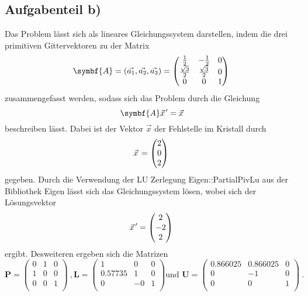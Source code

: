 \subsection*{Aufgabenteil b)}
Das Problem lässt sich als lineares Gleichungssystem darstellen, indem die drei primitiven Gittervektoren zu
der Matrix
\begin{equation}
  \symbf{A}=(\vec{a_1},\vec{a_2},\vec{a_3})=
  \begin{pmatrix}
    \frac{1}{2} & -\frac{1}{2} & 0 \\
    \frac{\sqrt{3}}{2} & \frac{\sqrt{3}}{2} & 0 \\
    0 & 0 & 1 \\
  \end{pmatrix} \\
\end{equation}
zusammengefasst werden, sodass sich das Problem durch die Gleichung
\begin{equation}
  \symbf{A}\pvec{x}'=\vec{x}
  \label{eqn:gitter}
\end{equation}
beschreiben lässt.
Dabei ist der Vektor $\vec{x}$ der Fehlstelle im Kristall durch
\begin{equation*}
  \pvec{x}=
  \begin{pmatrix}
    2 \\
    0 \\
    2 \\
  \end{pmatrix} \\
\end{equation*}
gegeben.
Durch die Verwendung der LU Zerlegung Eigen::PartialPivLu aus der Bibliothek Eigen lässt sich das Gleichungssystem lösen, wobei sich der Lösungsvektor
\begin{equation*}
  \pvec{x}'=
  \begin{pmatrix}
    2 \\
    -2 \\
    2 \\
  \end{pmatrix} \\
\end{equation*}
ergibt. Desweiteren ergeben sich die Matrizen
\begin{equation*}
  \symbf{P}=
  \begin{pmatrix}
    0 & 1 & 0 \\
    1 & 0 & 0 \\
    0 & 0 & 1 \\
  \end{pmatrix} \: ,
  \symbf{L}=
  \begin{pmatrix}
    1 & 0 & 0 \\
    0.57735 & 1 & 0 \\
    0 & -0 & 1 \\
  \end{pmatrix}
  \text{und }
  \symbf{U}=
  \begin{pmatrix}
    0.866025 & 0.866025 & 0 \\
    0 & -1 & 0 \\
    0 & 0 & 1 \\
  \end{pmatrix} \: .
\end{equation*}

